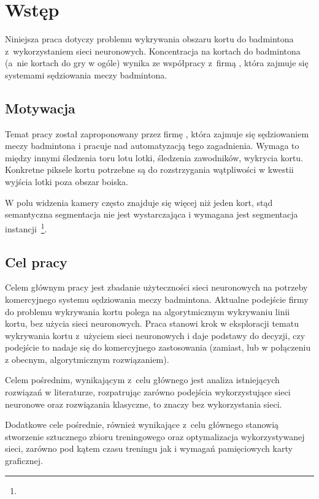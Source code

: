 \chapter{Wstęp}

Niniejsza praca dotyczy problemu wykrywania obszaru kortu do badmintona z~wykorzystaniem sieci neuronowych.
Koncentracja na kortach do badmintona (a~nie kortach do gry w ogóle) wynika ze współpracy z~firmą \blue{}, która zajmuje się systemami sędziowania meczy badmintona.

\section{Motywacja}

Temat pracy został zaproponowany przez firmę \blue{}, która zajmuje się sędziowaniem meczy badmintona i pracuje nad automatyzacją tego zagadnienia.
Wymaga to między innymi śledzenia toru lotu lotki, śledzenia zawodników, wykrycia kortu.
Konkretne piksele kortu potrzebne są do rozstrzygania wątpliwości w kwestii wyjścia lotki poza obszar boiska.

W polu widzenia kamery często znajduje się więcej niż jeden kort, stąd semantyczna segmentacja nie jest wystarczająca i wymagana jest segmentacja instancji~\footnote{}.

\section{Cel pracy}

Celem głównym pracy jest zbadanie użyteczności sieci neuronowych na potrzeby komercyjnego systemu sędziowania meczy badmintona.
Aktualne podejście firmy \blue{} do problemu wykrywania kortu polega na algorytmicznym wykrywaniu linii kortu, bez użycia sieci neuronowych.
Praca stanowi krok w eksploracji tematu wykrywania kortu z~użyciem sieci neuronowych i daje podstawy do decyzji, czy podejście to nadaje się do komercyjnego zastosowania (zamiast, lub w połączeniu z obecnym, algorytmicznym rozwiązaniem).

Celem pośrednim, wynikającym z~celu głównego jest analiza istniejących rozwiązań w literaturze, rozpatrując zarówno podejścia wykorzystujące sieci neuronowe oraz rozwiązania klasyczne, to znaczy bez wykorzystania sieci.

Dodatkowe cele pośrednie, również wynikające z~celu głównego stanowią stworzenie sztucznego zbioru treningowego oraz optymalizacja wykorzystywanej sieci, zarówno pod kątem czasu treningu jak i wymagań pamięciowych karty graficznej.

